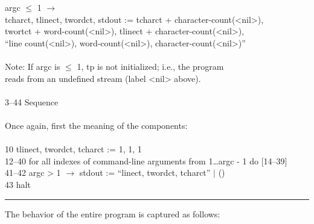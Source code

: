 \begin{tabbing}
	\> argc $\leq$ 1 $\rightarrow$\\
	\> \>	tcharct, tlinect, twordct, stdout := tcharct + character-count(<nil>),\\
	\> \>	twortct + word-count(<nil>), tlinect + character-count(<nil>), \\
	\> \>	``line count(<nil>), word-count(<nil>), character-count(<nil>)''\\
\\
	\> Note: If argc is $\leq$ 1, tp is not initialized; i.e., the program\\
	\> reads from an undefined stream (label <nil> above).\\
\\
3--44	\> Sequence\\
\\
	Once again, first the meaning of the components:\\
\\
10	\> tlinect, twordct, tcharct := 1, 1, 1\\
12--40	\> for all indexes of command-line arguments from 1{\ldots}argc - 1 do [14--39]\\
41--42	\> argc > 1 $\rightarrow$ stdout := ``linect, twordct, tcharct'' $\mid$ ()\\
43	\> halt\\
\rule{\textwidth}{.5pt}
\end{tabbing}

\noindent
The behavior of the entire program is captured as follows:

